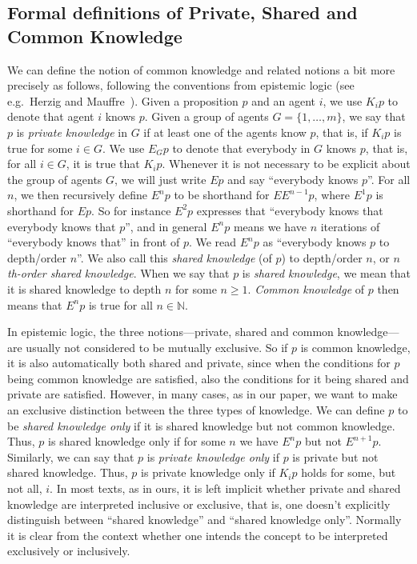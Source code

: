\subsection{Formal definitions of Private, Shared and Common Knowledge}
\label{A:definitions}
We can define the notion of common knowledge and related notions a bit more precisely as follows, following the conventions from epistemic logic (see e.g.\ Herzig and Mauffre~\cite{herzig2015share}). Given a proposition $p$ and an agent $i$, we use $K_i p$ to denote that agent $i$ knows $p$. Given a group of agents $G = \{1,\dots,m\}$, we say that $p$ is \emph{private knowledge} in $G$ if at least one of the agents know $p$, that is, if $K_i p$ is true for some $i \in G$. We use $E_G p$ to denote that everybody in $G$ knows $p$, that is, for all $i \in G$, it is true that $K_i p$. Whenever it is not necessary to be explicit about the group of agents $G$, we will just write $E p$ and say ``everybody knows $p$''. For all $n$, we then recursively define $E^n p$ to be shorthand for $E E^{n-1} p$, where $E^1 p$ is shorthand for $E p$. So for instance $E^2 p$ expresses that ``everybody knows that everybody knows that $p$'', and in general $E^n p$ means we have $n$ iterations of ``everybody knows that'' in front of $p$. We read $E^n p$ as ``everybody knows $p$ to depth/order $n$''. We also call this \emph{shared knowledge} (of $p$) to depth/order $n$, or \emph{$n$th-order shared knowledge}. When we say that $p$ is \emph{shared knowledge}, we mean that it is shared knowledge to depth $n$ for some $n \geq 1$. \emph{Common knowledge} of $p$ then means that $E^n p$ is true for all $n \in \mathbb{N}$.

In epistemic logic, the three notions---private, shared and common knowledge---are usually not considered to be mutually exclusive. So if $p$ is common knowledge, it is also automatically both shared and private, since when the conditions for $p$ being common knowledge are satisfied, also the conditions for it being shared and private are satisfied. However, in many cases, as in our paper, we want to make an exclusive distinction between the three types of knowledge. We can define $p$ to be \emph{shared knowledge only} if it is shared knowledge but not common knowledge. Thus, $p$ is shared knowledge only if for some $n$ we have $E^n p$ but not $E^{n+1} p$. Similarly, we can say that $p$ is \emph{private knowledge only} if $p$ is private but not shared knowledge. Thus, $p$ is private knowledge only if $K_i p$ holds for some, but not all, $i$. In most texts, as in ours, it is left implicit whether private and shared knowledge are interpreted inclusive or exclusive, that is, one doesn't explicitly distinguish between ``shared knowledge'' and ``shared knowledge only''. Normally it is clear from the context whether one intends the concept to be interpreted exclusively or inclusively. 

